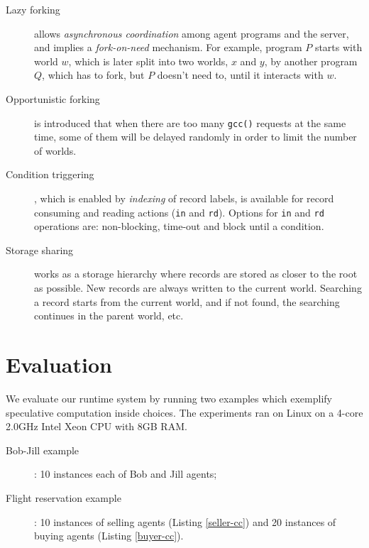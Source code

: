 \documentclass[preprint,10pt]{sigplanconf}
\newcommand{\monospace}[1]{\texttt{\small #1}}
\begin{document}
\begin{description}
  \item[Lazy forking] 
        allows \emph{asynchronous coordination} among 
        agent programs and the server, and implies a \emph{fork-on-need} mechanism. 
      For example, program $P$ starts with world $w$, 
        which is later split into two worlds, $x$ and $y$, by another program $Q$, 
        which has to fork, but $P$ doesn't need to, until it interacts with $w$.

  \item[Opportunistic forking] is introduced that when there are too many 
        \monospace{gcc()} requests at the same time, some of them will be 
        delayed randomly in order to limit the number of worlds. 

  \item[Condition triggering], 
        which is enabled by \emph{indexing} of record labels, 
        is available for record consuming and reading actions (\monospace{in} and \monospace{rd}). 
	Options for \monospace{in} and \monospace{rd} operations are:
	non-blocking, time-out and block until a condition.

  \item[Storage sharing] works as a storage hierarchy where records are stored 
        as closer to the root as possible. New records are always written to 
        the current world. Searching a record starts from the current world, 
        and if not found, the searching continues in the parent world, etc. 
\end{description}

\section{Evaluation}  %

We evaluate our runtime system by running two examples 
which exemplify speculative computation inside choices.
The experiments ran on Linux on a
  4-core 2.0GHz Intel Xeon CPU with 8GB RAM. 
\begin{description}
  \item[Bob-Jill example]: 
	10 instances each of Bob and Jill agents;
  \item[Flight reservation example]: 
	10 instances of selling agents (Listing \ref{seller-cc}) and
        20 instances of buying agents (Listing \ref{buyer-cc}). 
\end{description}
\end{document}
